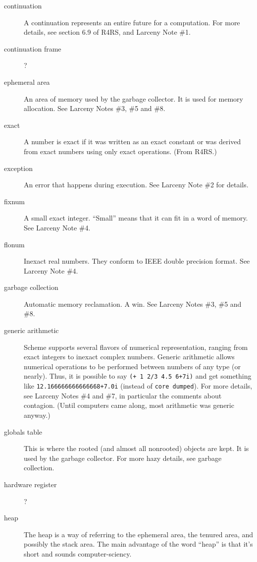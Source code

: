\begin{description}
\item[continuation]
A continuation represents an entire future for a computation.  For
more details, see section 6.9 of R4RS, and Larceny Note \#1.

\item[continuation frame]
?

\item[ephemeral area]
An area of memory used by the garbage collector.  It is used for 
memory allocation.
See Larceny Notes \#3, \#5 and \#8.

\item[exact]
A number is exact if it was written as an exact constant or was derived
from exact numbers using only exact operations. (From R4RS.) 

\item[exception]  An error that happens during execution.  See
Larceny Note \#2 for details.

\item[fixnum]
A small exact integer.  ``Small'' means that it can fit in a word
of memory.
See Larceny Note \#4.

\item[flonum]
Inexact real numbers.  They conform to IEEE double precision format.
See Larceny Note \#4.

\item[garbage collection]  
Automatic memory reclamation.  A win.
See Larceny Notes \#3, \#5 and \#8.

\item[generic arithmetic]
Scheme supports several flavors of numerical representation,
ranging from exact integers to inexact complex numbers.
Generic arithmetic allows numerical operations to be performed
between numbers of any type (or nearly).  Thus, it is possible
to say {\tt (+ 1 2/3 4.5 6+7i)} and get something like
{\tt 12.166666666666668+7.0i} (instead of {\tt core dumped}).
For more details, see Larceny Notes \#4 and \#7, in particular
the comments about contagion.  (Until computers came along, most
arithmetic was generic anyway.)

\item[globals table]
This is where the rooted (and almost all nonrooted) objects are kept.
It is used by the garbage collector.  For more hazy details, see
garbage collection.

\item[hardware register]
?

\item[heap] 
The heap is a way of referring to the ephemeral area, the tenured area,
and possibly the stack area.  The main advantage of the word ``heap'' 
is that it's short and sounds computer-sciency.


\end{description}
